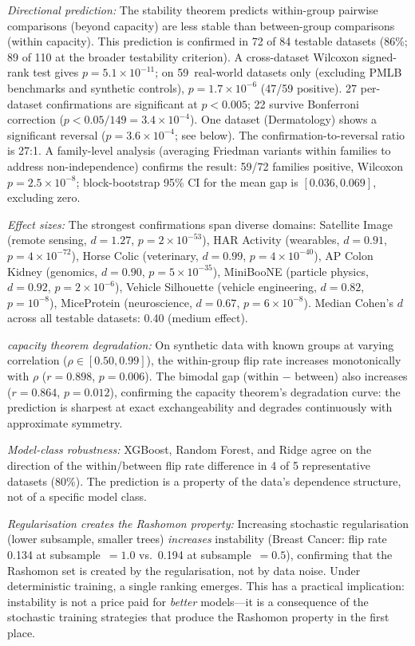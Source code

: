 \documentclass[11pt,a4paper]{article}
\begin{document}
\emph{Directional prediction:} The stability theorem predicts within-group pairwise comparisons (beyond capacity) are less stable than between-group comparisons (within capacity).  This prediction is confirmed in 72 of 84 testable datasets (86\%; 89 of 110 at the broader testability criterion).  A cross-dataset Wilcoxon signed-rank test gives $p = 5.1 \times 10^{-11}$; on 59~real-world datasets only (excluding PMLB benchmarks and synthetic controls), $p = 1.7 \times 10^{-6}$ (47/59 positive).  27 per-dataset confirmations are significant at $p < 0.005$; 22 survive Bonferroni correction ($p < 0.05/149 = 3.4 \times 10^{-4}$).  One dataset (Dermatology) shows a significant reversal ($p = 3.6 \times 10^{-4}$; see below).  The confirmation-to-reversal ratio is 27:1.  A family-level analysis (averaging Friedman variants within families to address non-independence) confirms the result: 59/72 families positive, Wilcoxon $p = 2.5 \times 10^{-8}$; block-bootstrap 95\% CI for the mean gap is $[0.036, 0.069]$, excluding zero.

\emph{Effect sizes:} The strongest confirmations span diverse domains: Satellite Image (remote sensing, $d = 1.27$, $p = 2 \times 10^{-53}$), HAR Activity (wearables, $d = 0.91$, $p = 4 \times 10^{-72}$), Horse Colic (veterinary, $d = 0.99$, $p = 4 \times 10^{-40}$), AP Colon Kidney (genomics, $d = 0.90$, $p = 5 \times 10^{-35}$), MiniBooNE (particle physics, $d = 0.92$, $p = 2 \times 10^{-6}$), Vehicle Silhouette (vehicle engineering, $d = 0.82$, $p = 10^{-8}$), MiceProtein (neuroscience, $d = 0.67$, $p = 6 \times 10^{-8}$).  Median Cohen's $d$ across all testable datasets: 0.40 (medium effect).

\emph{capacity theorem degradation:} On synthetic data with known groups at varying correlation ($\rho \in [0.50, 0.99]$), the within-group flip rate increases monotonically with $\rho$ ($r = 0.898$, $p = 0.006$).  The bimodal gap (within $-$ between) also increases ($r = 0.864$, $p = 0.012$), confirming the capacity theorem's degradation curve: the prediction is sharpest at exact exchangeability and degrades continuously with approximate symmetry.

\emph{Model-class robustness:} XGBoost, Random Forest, and Ridge agree on the direction of the within/between flip rate difference in 4 of 5 representative datasets (80\%).  The prediction is a property of the data's dependence structure, not of a specific model class.

\emph{Regularisation creates the Rashomon property:} Increasing stochastic regularisation (lower subsample, smaller trees) \emph{increases} instability (Breast Cancer: flip rate 0.134 at subsample~$= 1.0$ vs.\ 0.194 at subsample~$= 0.5$), confirming that the Rashomon set is created by the regularisation, not by data noise.  Under deterministic training, a single ranking emerges.  This has a practical implication: instability is not a price paid for \emph{better} models---it is a consequence of the stochastic training strategies that produce the Rashomon property in the first place.
\end{document}
